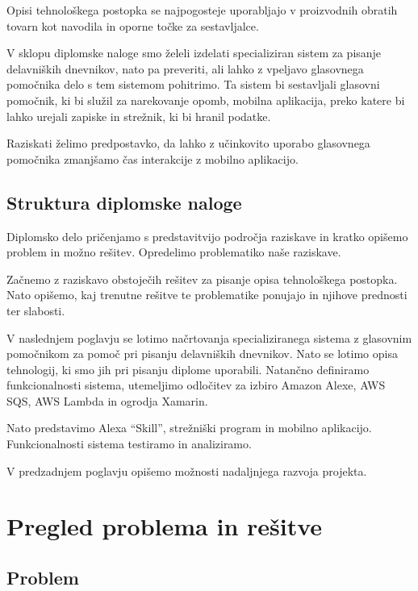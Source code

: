 \documentclass[a4paper, 12pt]{book}
\begin{document}
Opisi tehnološkega postopka se najpogosteje uporabljajo v proizvodnih obratih tovarn kot navodila in oporne točke za sestavljalce.

V sklopu diplomske naloge smo želeli izdelati specializiran sistem za pisanje delavniških dnevnikov, nato pa preveriti, ali lahko z vpeljavo glasovnega pomočnika delo s tem sistemom pohitrimo.
Ta sistem bi sestavljali glasovni pomočnik, ki bi služil za narekovanje opomb, mobilna aplikacija, preko katere bi lahko urejali zapiske in strežnik, ki bi hranil podatke.

Raziskati želimo predpostavko, da lahko z učinkovito uporabo glasovnega pomočnika zmanjšamo čas interakcije z mobilno aplikacijo.


\section{Struktura diplomske naloge}

Diplomsko delo pričenjamo s predstavitvijo področja raziskave in kratko opišemo problem in možno rešitev. 
Opredelimo problematiko naše raziskave.

Začnemo z raziskavo obstoječih rešitev za pisanje opisa tehnološkega postopka.
Nato opišemo, kaj trenutne rešitve te problematike ponujajo in njihove prednosti ter slabosti.

V naslednjem poglavju se lotimo načrtovanja specializiranega sistema z glasovnim pomočnikom za pomoč pri pisanju delavniških dnevnikov.
Nato se lotimo opisa tehnologij, ki smo jih pri pisanju diplome uporabili.
Natančno definiramo funkcionalnosti sistema, utemeljimo odločitev za izbiro Amazon Alexe, AWS SQS, AWS Lambda in ogrodja Xamarin.

Nato predstavimo Alexa \enquote{Skill}, strežniški program in mobilno aplikacijo.
Funkcionalnosti sistema testiramo in analiziramo.

V predzadnjem poglavju opišemo možnosti nadaljnjega razvoja projekta.

\chapter{Pregled problema in rešitve}

\section{Problem}
\end{document}
